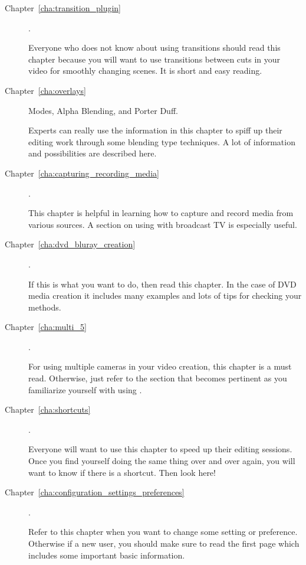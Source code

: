 \begin{description}
    \item[Chapter~\ref{cha:transition_plugin}] .

        Everyone who does not know about using transitions should read this chapter because you will want to use transitions between cuts in your video for smoothly changing scenes.
        It is short and easy reading.

    \item[Chapter~\ref{cha:overlays}]  Modes, Alpha Blending, and Porter Duff.

        Experts can really use the information in this chapter to spiff up their editing work through some blending type techniques.
        A lot of information and possibilities are described here.

    \item[Chapter~\ref{cha:capturing_recording_media}] .

        This chapter is helpful in learning how to capture and record media from various sources.  A section on using \CGG{} with broadcast TV is especially useful.

    \item[Chapter~\ref{cha:dvd_bluray_creation}] .

        If this is what you want to do, then read this chapter.
        In the case of DVD media creation it includes many examples and lots of tips for checking your methods.

    \item[Chapter~\ref{cha:multi_5}] .

        For using multiple cameras in your video creation, this chapter is a must read. Otherwise, just refer
        to the section that becomes pertinent as you familiarize yourself with using \CGG{}.

    \item[Chapter~\ref{cha:shortcuts}] .

        Everyone will want to use this chapter to speed up their editing sessions.
        Once you find yourself doing the same thing over and over again, you will want to know if there is a shortcut. Then look here!

    \item[Chapter~\ref{cha:configuration_settings_preferences}] .

        Refer to this chapter when you want to change some setting or preference.
        Otherwise if a new user, you should make sure to read the first page which includes some important basic information.


\end{description}
